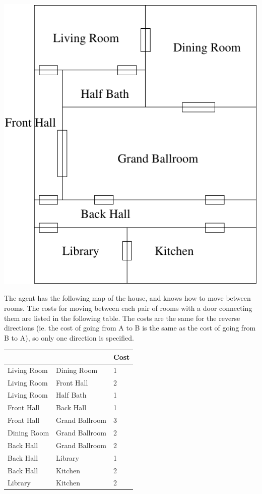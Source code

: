 \documentclass[12pt]{article}
\newcommand{\n}{\vspace{5mm}}
\begin{document}
\includegraphics[scale=0.85]{./images/house.pdf}
\n

The agent has the following map of the house, and knows how to move between
rooms. The costs for moving between each pair of rooms with a door connecting
them are listed in the following table.  The costs are the same for the reverse
directions (ie. the cost of going from A to B is the same as the cost of going
from B to A), so only one direction is specified.

\n
\begin{tabular}{|l|l|l|}
  \hline
  & & Cost \\
  \hline
  Living Room & Dining Room & 1 \\
  \hline
  Living Room & Front Hall & 2 \\
  \hline
  Living Room & Half Bath & 1 \\
  \hline
  Front Hall & Back Hall & 1 \\
  \hline
  Front Hall & Grand Ballroom & 3 \\
  \hline
  Dining Room & Grand Ballroom & 2 \\
  \hline
  Back Hall & Grand Ballroom & 2 \\
  \hline
  Back Hall & Library & 1 \\
  \hline
  Back Hall & Kitchen & 2 \\
  \hline
  Library & Kitchen & 2 \\
  \hline
\end{tabular}
\n
\end{document}
